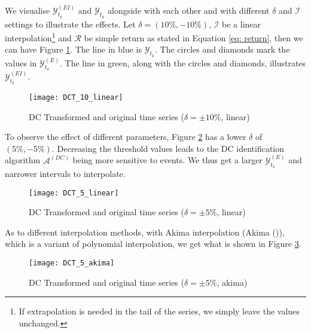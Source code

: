 We visualise $\mathcal{Y}^{(EI)}_{t_k}$ and $\mathcal{Y}_{t_k}$ alongside with each other and with different $\delta$ and $\mathcal{I}$ settings to illustrate the effects. Let $\delta = (10\%, -10\%)$, $\mathcal{I}$ be a linear interpolation\footnote{If extrapolation is needed in the tail of the series, we simply leave the values unchanged.} and $\mathcal{R}$ be simple return as stated in Equation \ref{eq: return}, then we can have Figure \ref{fig: dct 10 linear}. The line in blue is $\mathcal{Y}_{t_k}$. The circles and diamonds mark the values in $\mathcal{Y}^{(E)}_{t_k}$. The line in green, along with the circles and diamonds, illustrates $\mathcal{Y}^{(EI)}_{t_k}$.
\begin{figure}[H]
    \centering
    \texttt{[image: DCT\_10\_linear]}
    \caption{DC Transformed and original time series ($\delta = \pm 10\%$, linear)}
    {\raggedright \footnotesize \par}
    \label{fig: dct 10 linear}
\end{figure}
To observe the effect of different parameters, Figure \ref{fig: dct 5 linear} has a lower $\delta$ of $(5\%, -5\%)$. Decreasing the threshold values leads to the DC identification algorithm $\mathcal{A}^{(DC)}$ being more sensitive to events. We thus get a larger $\mathcal{Y}^{(E)}_{t_k}$ and narrower intervals to interpolate.
\begin{figure}[H]
    \centering
    \texttt{[image: DCT\_5\_linear]}
    \caption{DC Transformed and original time series ($\delta = \pm 5\%$, linear)}
    {\raggedright \footnotesize \par}
    \label{fig: dct 5 linear}
\end{figure}
As to different interpolation methods, with Akima interpolation (Akima (\citeyear{akima1970new})), which is a variant of polynomial interpolation, we get what is shown in Figure \ref{fig: dct 5 akima}.
\begin{figure}[H]
    \centering
    \texttt{[image: DCT\_5\_akima]}
    \caption{DC Transformed and original time series ($\delta = \pm 5\%$, akima)}
    {\raggedright \footnotesize \par}
    \label{fig: dct 5 akima}
\end{figure}

